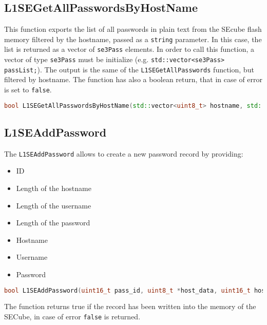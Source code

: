 \subsection{L1SEGetAllPasswordsByHostName}
This function exports the list of all passwords in plain text from the SEcube flash memory filtered by the hostname, passed as a \texttt{string} parameter. In this case, the list is returned as a vector of \texttt{se3Pass} elements. In order to call this function, a vector of type \texttt{se3Pass} must be initialize (e.g. \texttt{std::vector<se3Pass> passList;}).\newline\newline
The output is the same of the \texttt{L1SEGetAllPasswords} function, but filtered by hostname.\newline\newline
The function has also a boolean return, that in case of error is set to \texttt{false}.

\begin{lstlisting}[language=C++,breaklines=true]
	bool L1SEGetAllPasswordsByHostName(std::vector<uint8_t> hostname, std::vector<se3Pass>& passList);
\end{lstlisting}

\subsection{L1SEAddPassword}
The \texttt{L1SEAddPassword} allows to create a new password record by providing:
\begin{itemize}
	\itemsep0sp
	\item ID
	\item Length of the hostname
	\item Length of the username
	\item Length of the password
	\item Hostname
	\item Username
	\item Password
\end{itemize}

\begin{lstlisting}[language=C++,breaklines=true]
	bool L1SEAddPassword(uint16_t pass_id, uint8_t *host_data, uint16_t host_len, uint8_t *user_data, uint16_t user_len, uint8_t *pass_data, uint16_t pass_len);
\end{lstlisting}

The function returns true if the record has been written into the memory of the SECube, in case of error \texttt{false} is returned.

